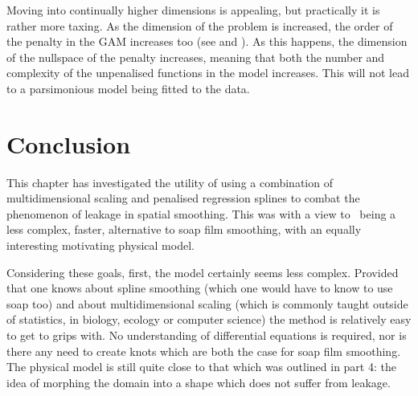 Moving into continually higher dimensions is appealing, but practically it is rather more taxing. As the dimension of the problem is increased, the order of the penalty in the GAM increases too (see  and ). As this happens, the dimension of the nullspace of the penalty increases, meaning that both the number and complexity of the unpenalised functions in the model increases. This will not lead to a parsimonious model being fitted to the data.

\section{Conclusion}
\label{mds-conc}

This chapter has investigated the utility of using a combination of multidimensional scaling and penalised regression splines to combat the phenomenon of leakage in spatial smoothing. This was with a view to \mdsap\ being a less complex, faster, alternative to soap film smoothing, with an equally interesting motivating physical model.

Considering these goals, first, the model certainly seems less complex. Provided that one knows about spline smoothing (which one would have to know to use soap too) and about multidimensional scaling (which is commonly taught outside of statistics, in biology, ecology or computer science) the method is relatively easy to get to grips with. No understanding of differential equations is required, nor is there any need to create knots which are both the case for soap film smoothing. The physical model is still quite close to that which was outlined in  part 4: the idea of morphing the domain into a shape which does not suffer from leakage.

